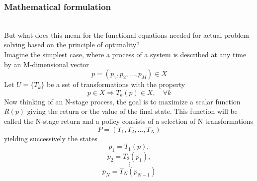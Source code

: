 \documentclass[conference]{IEEEtran}
\begin{document}
\subsubsection{Mathematical formulation} 
\quad \\
But what does this mean for the functional equations needed for actual problem solving based on the principle of optimality?
\\
Imagine the simplest case, where a process of a system is described at any time by an M-dimensional vector
\begin{equation}
p = (p_1, p_2, ..., p_M) \in X
\end{equation}
Let $U = \{T_k\}$ be a set of transformations with the property
\begin{equation}
p \in X \Rightarrow T_k(p) \in X, \quad \forall k
\end{equation}
Now thinking of an N-stage process, the goal is to maximize a scalar function $R(p)$ giving the return or the value of the final state. This function will be called the N-stage return and a policy consists of a selection of N transformations 
\begin{equation}
P = (T_1, T_2, ..., T_N)
\end{equation}
yielding successively the states
\begin{equation*}
p_1 = T_1(p),
\end{equation*}
\begin{equation*}
p_2 = T_2(p_1),
\end{equation*}
\begin{equation}
\vdots
\end{equation}
\begin{equation*}
p_N = T_N(p_{N-1}) 
\end{equation*}
\end{document}
